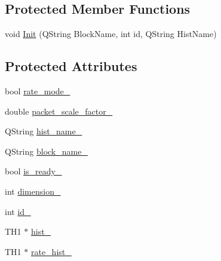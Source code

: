 \subsection*{\-Protected \-Member \-Functions}
\begin{DoxyCompactItemize}
\item 
void \hyperlink{classGRIHistogrammer_ab8e81b158c6926a277af05e7956603a1}{\-Init} (\-Q\-String \-Block\-Name, int id, \-Q\-String \-Hist\-Name)
\end{DoxyCompactItemize}
\subsection*{\-Protected \-Attributes}
\begin{DoxyCompactItemize}
\item 
bool \hyperlink{classGRIHistogrammer_a49b765d037e31ac24d9f2215d4c336a0}{rate\-\_\-mode\-\_\-}
\item 
double \hyperlink{classGRIHistogrammer_a7648c469405d547dfd245a42ef10eaf0}{packet\-\_\-scale\-\_\-factor\-\_\-}
\item 
\-Q\-String \hyperlink{classGRIHistogrammer_a86f352e7f348578e24c5e417be5ecc7b}{hist\-\_\-name\-\_\-}
\item 
\-Q\-String \hyperlink{classGRIHistogrammer_a862f21981d2a6a92e2e588b767de0158}{block\-\_\-name\-\_\-}
\item 
bool \hyperlink{classGRIHistogrammer_afd8b37edcd387d628336849a8dd0e9b9}{is\-\_\-ready\-\_\-}
\item 
int \hyperlink{classGRIHistogrammer_ac1df0411fc85f0190e00b9e579237583}{dimension\-\_\-}
\item 
int \hyperlink{classGRIHistogrammer_a9391e0f2c821b102f39c4bbcfbb10521}{id\-\_\-}
\item 
\-T\-H1 $\ast$ \hyperlink{classGRIHistogrammer_a684bfe1f9f8aa6f8ee562ab845fbb7c2}{hist\-\_\-}
\item 
\-T\-H1 $\ast$ \hyperlink{classGRIHistogrammer_a9c464852bf5261ae03c61c5c88a7c9d7}{rate\-\_\-hist\-\_\-}
\end{DoxyCompactItemize}


